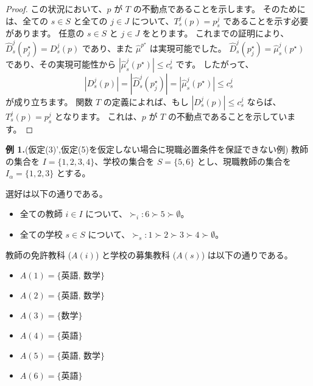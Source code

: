 \documentclass[12pt, a4paper]{article}
\theoremstyle{definition}
\theoremstyle{remark}
\theoremstyle{plain}
\begin{document}
\begin{proof}

この状況において、$p$ が $T$ の不動点であることを示します。
そのためには、全ての $s \in S$ と全ての $j \in J$ について、$T_s^j(p) = p_s^j$ であることを示す必要があります。
任意の $s \in S$ と $j \in J$ をとります。
これまでの証明により、$\widehat{D}_s^j(p^\star_j) = D_s^j(p)$ であり、また $\widehat{\mu}^{p^\star}$ は実現可能でした。
$\widehat{D}_s^j(p^\star_j) = \widehat{\mu}_s^j(p^\star)$ であり、その実現可能性から $|\widehat{\mu}_s^j(p^\star)| \leq c_s^j$ です。
したがって、
\[
|D_s^j(p)| = |\widehat{D}_s^j(p^\star_j)| = |\widehat{\mu}_s^j(p^\star)| \leq c_s^j
\]
が成り立ちます。
関数 $T$ の定義によれば、もし $| D_s^j(p) | \leq c^j_s$ ならば、$T_s^j(p) = p_s^j$ となります。
これは、$p$ が $T$ の不動点であることを示しています。
\end{proof}




\textbf{例 1.}(仮定(3)',仮定(5)を仮定しない場合に現職必置条件を保証できない例)
教師の集合を $I = \{1,2,3,4\}$、学校の集合を $S = \{5,6\}$ とし、現職教師の集合を $I_\alpha = \{1,2,3\}$ とする。

選好は以下の通りである。
\begin{itemize}
    \item 全ての教師 $i \in I$ について、$\succ_i: 6 \succ 5 \succ \emptyset$。
    \item 全ての学校 $s \in S$ について、$\succ_s: 1 \succ 2 \succ 3 \succ 4 \succ \emptyset$。
\end{itemize}

教師の免許教科 ($A(i)$) と学校の募集教科 ($A(s)$) は以下の通りである。
\begin{itemize}
    \item $A(1) = \{\text{英語, 数学}\}$
    \item $A(2) = \{\text{英語, 数学}\}$
    \item $A(3) = \{\text{数学}\}$
    \item $A(4) = \{\text{英語}\}$
    \item $A(5) = \{\text{英語, 数学}\}$
    \item $A(6) = \{\text{英語}\}$
\end{itemize}
\end{document}
